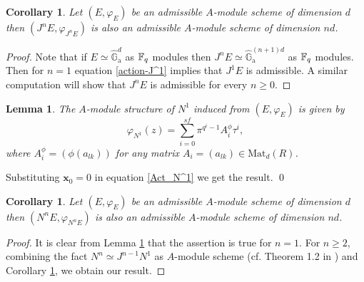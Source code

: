 \documentclass{amsart}
\newtheorem {lemma}[theorem] {\bf Lemma}
\newtheorem {corollary}[theorem] {\bf Corollary}
\numberwithin {equation}{section}
\def \hG{\hat{\mathbb{G}}_{\mathrm{a}}}
\begin{document}
\begin{corollary}\label{admsbl-J^n} Let $(E,\varphi_{E})$ be an admissible $A$-module scheme of dimension $d$ then $(J^{n}E,\varphi_{J^{n}E})$ is also an admissible $A$-module scheme of dimension $nd$.
\end{corollary}
 \begin{proof}
 Note that if $E\simeq \hG^{d}$ as ${\mathbb F}_{q}$ modules then $J^{n}E\simeq \hG^{(n+1)d}$ as ${\mathbb F}_{q}$ modules. Then for $n=1$ equation \eqref{action-J^1} implies that $J^{1}E$ is admissible. A similar computation will show that $J^{n}E$ is admissible for every $n\geq 0$.
 \end{proof}
\begin{lemma}\label{action_N^{1}} The $A$-module structure of $N^{1}$ induced from $(E,\varphi_{E})$ is given by $$\varphi_{N^{1}}(z)=\displaystyle{\sum_{i=0}^{sf}}\pi^{q^{i}-1}A_{i}^{\phi}{\tau}^{i},$$ where $A_{i}^{\phi}=\left(\phi(a_{lk})\right)$ for any matrix $A_{i}=(a_{lk})\in\mathrm{Mat}_{d}(R)$.
\end{lemma}
\proof  Substituting $\mathbf{x}_{0}=0$ in equation \eqref{Act_N^1} we get the result.        \qed

\begin{corollary} Let $(E,\varphi_{E})$ be an admissible $A$-module scheme of dimension $d$ then $(N^{n}E,\varphi_{N^{n}E})$ is also an admissible $A$-module scheme of dimension $nd$.
\end{corollary}
\begin{proof}
It is clear from  Lemma \ref{action_N^{1}} that the assertion is true for $n=1$. For $n\geq 2$, combining the fact $N^{n}\simeq J^{n-1}N^{1}$ as $A$-module scheme (cf. Theorem 1.2 in \cite{PS-2}) and Corollary \ref{admsbl-J^n}, we obtain our result.
\end{proof}
\bigskip
\end{document}
